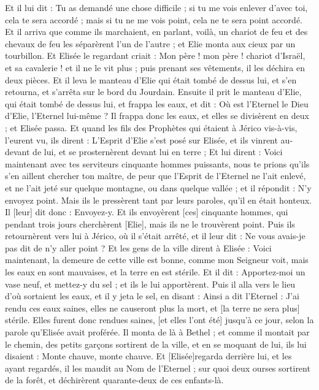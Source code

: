 \begin{multicols}{2}
Et il lui dit : Tu as demandé une chose difficile ; si tu me vois enlever d'avec toi, cela te sera accordé ; mais si tu ne me vois point, cela ne te sera point accordé.
Et il arriva que comme ils marchaient, en parlant, voilà, un chariot de feu et des chevaux de feu les séparèrent l'un de l'autre ; et Elie monta aux cieux par un tourbillon.
Et Elisée le regardant criait : Mon père ! mon père ! chariot d'Israël, et sa cavalerie ! et il ne le vit plus ; puis prenant ses vêtements, il les déchira en deux pièces.
Et il leva le manteau d'Elie qui était tombé de dessus lui, et s'en retourna, et s'arrêta sur le bord du Jourdain.
Ensuite il prit le manteau d'Elie, qui était tombé de dessus lui, et frappa les eaux, et dit : Où est l'Eternel le Dieu d'Elie, l'Eternel lui-même ? Il frappa donc les eaux, et elles se divisèrent en deux ; et Elisée passa.
Et quand les fils des Prophètes qui étaient à Jérico vis-à-vis, l'eurent vu, ils dirent : L'Esprit d'Elie s'est posé sur Elisée, et ils vinrent au-devant de lui, et se prosternèrent devant lui en terre ;
Et lui dirent : Voici maintenant avec tes serviteurs cinquante hommes puissants, nous te prions qu'ils s'en aillent chercher ton maître, de peur que l'Esprit de l'Eternel ne l'ait enlevé, et ne l'ait jeté sur quelque montagne, ou dans quelque vallée ; et il répondit : N'y envoyez point.
Mais ils le pressèrent tant par leurs paroles, qu'il en était honteux. Il [leur] dit donc : Envoyez-y. Et ils envoyèrent [ces] cinquante hommes, qui pendant trois jours cherchèrent [Elie], mais ils ne le trouvèrent point.
Puis ils retournèrent vers lui à Jérico, où il s'était arrêté, et il leur dit : Ne vous avais-je pas dit de n'y aller point ?
Et les gens de la ville dirent à Elisée : Voici maintenant, la demeure de cette ville est bonne, comme mon Seigneur voit, mais les eaux en sont mauvaises, et la terre en est stérile.
Et il dit : Apportez-moi un vase neuf, et mettez-y du sel ; et ils le lui apportèrent.
Puis il alla vers le lieu d'où sortaient les eaux, et il y jeta le sel, en disant : Ainsi a dit l'Eternel : J'ai rendu ces eaux saines, elles ne causeront plus la mort, et [la terre ne sera plus] stérile.
Elles furent donc rendues saines, [et elles l'ont été] jusqu'à ce jour, selon la parole qu'Elisée avait proférée.
Il monta de là à Bethel ; et comme il montait par le chemin, des petits garçons sortirent de la ville, et en se moquant de lui, ils lui disaient : Monte chauve, monte chauve.
Et [Elisée]regarda derrière lui, et les ayant regardés, il les maudit au Nom de l'Eternel ; sur quoi deux ourses sortirent de la forêt, et déchirèrent quarante-deux de ces enfants-là.

\end{multicols}
